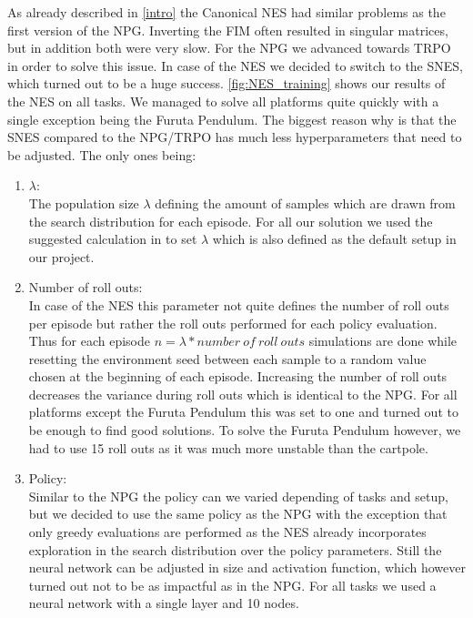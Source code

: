 As already described in \autoref{intro} the Canonical NES had similar problems as the first version of the NPG. Inverting the FIM often resulted in singular matrices, but in addition both were very slow. For the NPG we advanced towards TRPO in order to solve this issue. In case of the NES we decided to switch to the SNES, which turned out to be a huge success. \autoref{fig:NES_training} shows our results of the NES on all tasks. We managed to solve all platforms quite quickly with a single exception being the Furuta Pendulum. The biggest reason why is that the SNES compared to the NPG/TRPO has much less hyperparameters that need to be adjusted. The only ones being:
\begin{enumerate}
  \item $\lambda$: \\
  The population size $\lambda$ defining the amount of samples which are drawn from the search distribution for each episode. For all our solution we used the suggested calculation in \cite{Wierstra14} to set $\lambda$ which is also defined as the default setup in our project. \\
  \item Number of roll outs: \\
  In case of the NES this parameter not quite defines the number of roll outs per episode but rather the roll outs performed for each policy evaluation. Thus for each episode $n = \lambda * number \ of \ roll \ outs$ simulations are done while resetting the environment seed between each sample to a random value chosen at the beginning of each episode. Increasing the number of roll outs decreases the variance during roll outs which is identical to the NPG. For all platforms except the Furuta Pendulum this was set to one and turned out to be enough to find good solutions. To solve the Furuta Pendulum however, we had to use 15 roll outs as it was much more unstable than the cartpole. \\
  \item Policy: \\
  Similar to the NPG the policy can we varied depending of tasks and setup, but we decided to use the same policy as the NPG with the exception that only greedy evaluations are performed as the NES already incorporates exploration in the search distribution over the policy parameters. Still the neural network can be adjusted in size and activation function, which however turned out not to be as impactful as in the NPG. For all tasks we used a neural network with a single layer and 10 nodes.
\end{enumerate}

